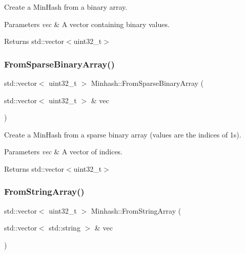Create a Min\+Hash from a binary array. 


\begin{DoxyParams}{Parameters}
{\em vec} & A vector containing binary values. \\
\hline
\end{DoxyParams}
\begin{DoxyReturn}{Returns}
std\+::vector$<$uint32\+\_\+t$>$ 
\end{DoxyReturn}
\mbox{\label{classMinhash_afe2cf6cc64b2e97ce89db4087febf30f}} 
\subsubsection{\texorpdfstring{From\+Sparse\+Binary\+Array()}{FromSparseBinaryArray()}}
{\footnotesize\ttfamily std\+::vector$<$ uint32\+\_\+t $>$ Minhash\+::\+From\+Sparse\+Binary\+Array (\begin{DoxyParamCaption}\item[{std\+::vector$<$ uint32\+\_\+t $>$ \&}]{vec }\end{DoxyParamCaption})}



Create a Min\+Hash from a sparse binary array (values are the indices of 1s). 


\begin{DoxyParams}{Parameters}
{\em vec} & A vector of indices. \\
\hline
\end{DoxyParams}
\begin{DoxyReturn}{Returns}
std\+::vector$<$uint32\+\_\+t$>$ 
\end{DoxyReturn}
\mbox{\label{classMinhash_a7131b7dbefd40e0d24d7e37601519d62}} 
\subsubsection{\texorpdfstring{From\+String\+Array()}{FromStringArray()}}
{\footnotesize\ttfamily std\+::vector$<$ uint32\+\_\+t $>$ Minhash\+::\+From\+String\+Array (\begin{DoxyParamCaption}\item[{std\+::vector$<$ std\+::string $>$ \&}]{vec }\end{DoxyParamCaption})}



